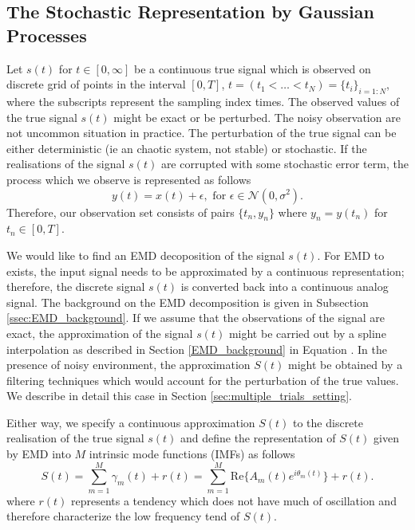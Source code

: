 \subsection{The Stochastic Representation by Gaussian Processes}
Let $s(t)$ for $t\in [0,\infty]$ be a continuous true signal which is observed on discrete grid of points in the interval $[0,T]$, $t =( t_1 < \dots <t_N ) = \{ t_i \}_{i=1:N}$, where the subscripts represent the sampling index times. The observed values of the true signal $s(t)$ might be exact or be perturbed. The noisy observation are not uncommon situation in practice. The perturbation of the true signal can be either deterministic (ie an chaotic system, not stable) or stochastic.  If the realisations of the signal $s(t)$ are corrupted with some stochastic error term, the process which we observe is represented as follows
\begin{equation}\label{eq:signal_noisy_y}
y(t) = x(t) + \epsilon, \text{ for } \epsilon \in \mathcal{N}(0, \sigma^2).
\end{equation}
Therefore, our observation set consists of pairs $\big\{t_n,y_n\big\}$ where $y_n = y(t_n)$ for $t_n \in [0,T]$. 

We would like to find an EMD decoposition of the signal $s(t)$. For EMD to exists, the input signal needs to be approximated by a continuous representation; therefore, the discrete signal $s(t)$ is converted back into a continuous analog signal. The background on the EMD decomposition is given in Subsection \ref{ssec:EMD_background}. If we assume that the observations of the signal are exact, the approximation of the signal $s(t)$ might be carried out by a spline interpolation as described in Section \ref{EMD_background} in Equation \label{cubic_spl}. In the presence of noisy environment, the approximation $S(t)$ might be obtained by a filtering techniques which would account for the perturbation of the true values. We describe in detail this case in Section \ref{sec:multiple_trials_setting}.  

Either way, we specify a continuous approximation $S(t)$ to the discrete realisation of the true signal $s(t)$ and define the representation of $S(t)$ given by EMD into $M$ intrinsic mode functions (IMFs) as follows 
\begin{equation}\label{eq:model_x_EMD}
S(t) = \sum_{m = 1}^M \gamma_m(t) + r(t) = \sum_{m = 1}^M \text{Re}\Big\{ A_m(t)  e^{i \theta_m(t)} \Big\} + r(t).
\end{equation}
where $r(t)$ represents a tendency which does not have much of oscillation and therefore characterize the low frequency tend of $S(t)$. 

